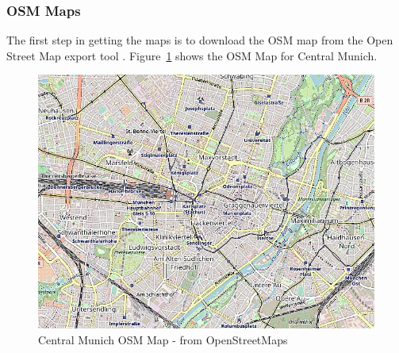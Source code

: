 	\subsubsection{OSM Maps}
	The first step in getting the maps is to download the OSM map from the Open Street Map export tool \cite{openstreetmap-export}. Figure~\ref{fig:munich-map} shows the OSM Map for Central Munich.
	\newline
	\begin{figure}[h]
		\centering
		\includegraphics[scale=0.5]{./figures/central-munich-osm}
		\caption{Central Munich OSM Map - from OpenStreetMaps \cite{openstreetmap}}
		\label{fig:munich-map}
	\end{figure}

